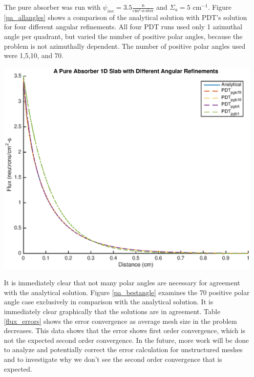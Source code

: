 The pure absorber was run with $\psi_{inc} = 3.5 \frac{\text{n}}{\text{cm}^2\text{-s-ster}}$ and $\Sigma_a = 5 \text{ cm}^{-1}$. Figure \ref{pa_allangles} shows a comparison of the analytical solution with PDT's solution for four different angular refinements. All four PDT runs used only 1 azimuthal angle per quadrant, but varied the number of positive polar angles, because the problem is not azimuthally dependent. The number of positive polar angles used were 1,5,10, and 70. 

\noindent\begin{minipage}{\textwidth}
\centering
\includegraphics[scale = 0.8]{figures/PureAbsorberAllAngles.eps}
\label{pa_allangles}
\end{minipage}
\smallskip

It is immediately clear that not many polar angles are necessary for agreement with the analytical solution. Figure \ref{pa_bestangle} examines the 70 positive polar angle case exclusively in comparison with the analytical solution. It is immediately clear graphically that the solutions are in agreement. Table \ref{flux_errors} shows the error convergence as average mesh size in the problem decreases. This data shows that the error shows first order convergence, which is not the expected second order convergence. In the future, more work will be done to analyze and potentially correct the error calculation for unstructured meshes and to investigate why we don't see the second order convergence that is expected.

